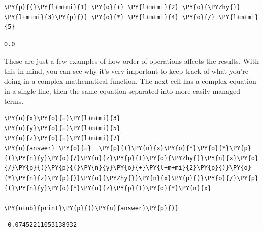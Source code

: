     \begin{tcolorbox}[breakable, size=fbox, boxrule=1pt, pad at break*=1mm,colback=cellbackground, colframe=cellborder]
\begin{Verbatim}[commandchars=\\\{\}]
\PY{p}{(}\PY{l+m+mi}{1} \PY{o}{+} \PY{l+m+mi}{2} \PY{o}{\PYZhy{}} \PY{l+m+mi}{3}\PY{p}{)} \PY{o}{*} \PY{l+m+mi}{4} \PY{o}{/} \PY{l+m+mi}{5}
\end{Verbatim}
\end{tcolorbox}

            \begin{tcolorbox}[breakable, size=fbox, boxrule=.5pt, pad at break*=1mm, opacityfill=0]
\begin{Verbatim}[commandchars=\\\{\}]
0.0
\end{Verbatim}
\end{tcolorbox}
        
    These are just a few examples of how order of operations affects the
results. With this in mind, you can see why it's very important to keep
track of what you're doing in a complex mathematical function. The next
cell has a complex equation in a single line, then the same equation
separated into more easily-managed terms.

    \begin{tcolorbox}[breakable, size=fbox, boxrule=1pt, pad at break*=1mm,colback=cellbackground, colframe=cellborder]
\begin{Verbatim}[commandchars=\\\{\}]
\PY{n}{x}\PY{o}{=}\PY{l+m+mi}{3}
\PY{n}{y}\PY{o}{=}\PY{l+m+mi}{5}
\PY{n}{z}\PY{o}{=}\PY{l+m+mi}{7}
\PY{n}{answer} \PY{o}{=}  \PY{p}{(}\PY{n}{x}\PY{o}{*}\PY{o}{*}\PY{p}{(}\PY{n}{y}\PY{o}{/}\PY{n}{z}\PY{p}{)}\PY{o}{\PYZhy{}}\PY{n}{x}\PY{o}{/}\PY{p}{(}\PY{p}{(}\PY{n}{y}\PY{o}{+}\PY{l+m+mi}{2}\PY{p}{)}\PY{o}{*}\PY{n}{z}\PY{p}{)}\PY{o}{\PYZhy{}}\PY{n}{x}\PY{p}{)}\PY{o}{/}\PY{p}{(}\PY{n}{y}\PY{o}{*}\PY{n}{z}\PY{p}{)}\PY{o}{*}\PY{n}{x}

\PY{n+nb}{print}\PY{p}{(}\PY{n}{answer}\PY{p}{)}
\end{Verbatim}
\end{tcolorbox}

    \begin{Verbatim}[commandchars=\\\{\}]
-0.07452211053138932
    \end{Verbatim}

